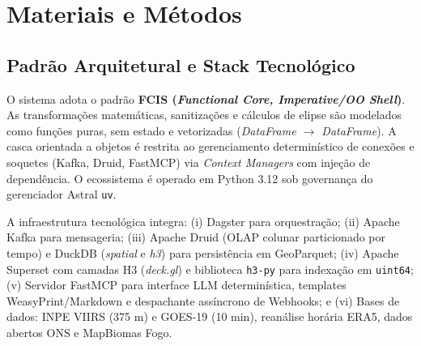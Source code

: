 \section{Materiais e Métodos}
\label{sc:materiais_e_metodos}

\subsection{Padrão Arquitetural e Stack Tecnológico}
O sistema adota o padrão \textbf{FCIS (\textit{Functional Core, Imperative/OO Shell})}. As transformações matemáticas, sanitizações e cálculos de elipse são modelados como funções puras, sem estado e vetorizadas (\textit{DataFrame $\rightarrow$ DataFrame}). A casca orientada a objetos é restrita ao gerenciamento determinístico de conexões e soquetes (Kafka, Druid, FastMCP) via \textit{Context Managers} com injeção de dependência. O ecossistema é operado em Python 3.12 sob governança do gerenciador Astral \texttt{uv}.

A infraestrutura tecnológica integra: (i) Dagster para orquestração; (ii) Apache Kafka para mensageria; (iii) Apache Druid (OLAP colunar particionado por tempo) e DuckDB (\textit{spatial} e \textit{h3}) para persistência em GeoParquet; (iv) Apache Superset com camadas H3 (\textit{deck.gl}) e biblioteca \texttt{h3-py} para indexação em \texttt{uint64}; (v) Servidor FastMCP para interface LLM determinística, templates WeasyPrint/Markdown e despachante assíncrono de Webhooks; e (vi) Bases de dados: INPE VIIRS (375 m) e GOES-19 (10 min), reanálise horária ERA5, dados abertos ONS e MapBiomas Fogo.

